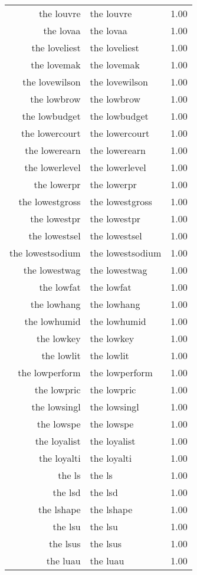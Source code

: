 \begin{table}[ht]
\begin{tabular}{rlr}
  the louvre & the louvre & 1.00 \\ 
  the lovaa & the lovaa & 1.00 \\ 
  the loveliest & the loveliest & 1.00 \\ 
  the lovemak & the lovemak & 1.00 \\ 
  the lovewilson & the lovewilson & 1.00 \\ 
  the lowbrow & the lowbrow & 1.00 \\ 
  the lowbudget & the lowbudget & 1.00 \\ 
  the lowercourt & the lowercourt & 1.00 \\ 
  the lowerearn & the lowerearn & 1.00 \\ 
  the lowerlevel & the lowerlevel & 1.00 \\ 
  the lowerpr & the lowerpr & 1.00 \\ 
  the lowestgross & the lowestgross & 1.00 \\ 
  the lowestpr & the lowestpr & 1.00 \\ 
  the lowestsel & the lowestsel & 1.00 \\ 
  the lowestsodium & the lowestsodium & 1.00 \\ 
  the lowestwag & the lowestwag & 1.00 \\ 
  the lowfat & the lowfat & 1.00 \\ 
  the lowhang & the lowhang & 1.00 \\ 
  the lowhumid & the lowhumid & 1.00 \\ 
  the lowkey & the lowkey & 1.00 \\ 
  the lowlit & the lowlit & 1.00 \\ 
  the lowperform & the lowperform & 1.00 \\ 
  the lowpric & the lowpric & 1.00 \\ 
  the lowsingl & the lowsingl & 1.00 \\ 
  the lowspe & the lowspe & 1.00 \\ 
  the loyalist & the loyalist & 1.00 \\ 
  the loyalti & the loyalti & 1.00 \\ 
  the ls & the ls & 1.00 \\ 
  the lsd & the lsd & 1.00 \\ 
  the lshape & the lshape & 1.00 \\ 
  the lsu & the lsu & 1.00 \\ 
  the lsus & the lsus & 1.00 \\ 
  the luau & the luau & 1.00 \\ 

\end{tabular}
\end{table}
